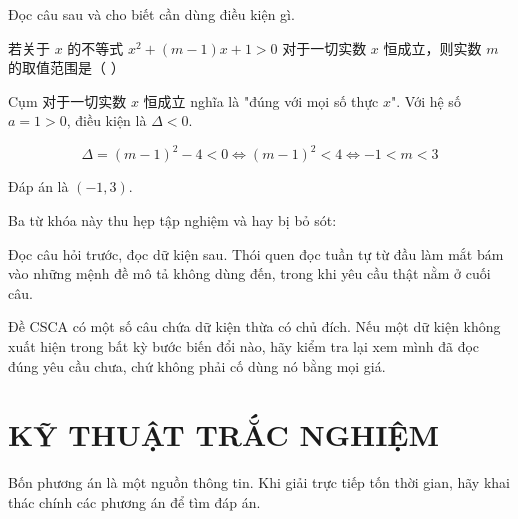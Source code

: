 \documentclass[11pt, a4paper]{article}
\begin{document}
\begin{vidu}[{7}]
Đọc câu sau và cho biết cần dùng điều kiện gì.

若关于 $x$ 的不等式 $x^2 + (m-1)x + 1 > 0$ 对于一切实数 $x$ 恒成立，则实数 $m$ 的取值范围是（ ）

Cụm 对于一切实数 $x$ 恒成立 nghĩa là "đúng với mọi số thực $x$". Với hệ số $a = 1 > 0$, điều kiện là $\Delta < 0$.

$$\Delta = (m-1)^2 - 4 < 0 \iff (m-1)^2 < 4 \iff -1 < m < 3$$

Đáp án là $(-1, 3)$.

\begin{dinhly}
Ba từ khóa này thu hẹp tập nghiệm và hay bị bỏ sót:


 Đọc câu hỏi trước, đọc dữ kiện sau. Thói quen đọc tuần tự từ đầu làm mắt bám vào những mệnh đề mô tả không dùng đến, trong khi yêu cầu thật nằm ở cuối câu.

 Đề CSCA có một số câu chứa dữ kiện thừa có chủ đích. Nếu một dữ kiện không xuất hiện trong bất kỳ bước biến đổi nào, hãy kiểm tra lại xem mình đã đọc đúng yêu cầu chưa, chứ không phải cố dùng nó bằng mọi giá.

\end{dinhly}
\end{vidu}
\section{KỸ THUẬT TRẮC NGHIỆM}

Bốn phương án là một nguồn thông tin. Khi giải trực tiếp tốn thời gian, hãy khai thác chính các phương án để tìm đáp án.
\end{document}
